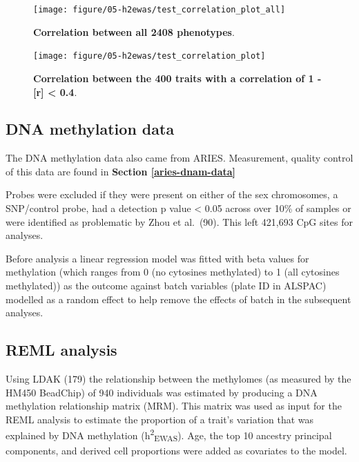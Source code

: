 \documentclass[11pt,oneside]{bristolthesis}
\begin{document}
\begin{figure}

{\centering \texttt{[image: figure/05-h2ewas/test\_correlation\_plot\_all]} 

}

\caption[Correlation between all 2408 phenotypes]{\textbf{Correlation between all 2408 phenotypes}.}\label{fig:h2ewas-pheno-corr-all}
\end{figure}



\begin{figure}

{\centering \texttt{[image: figure/05-h2ewas/test\_correlation\_plot]} 

}

\caption[Correlation between the 400 traits with a correlation of 1 - {[}r{]} \textless{} 0.4]{\textbf{Correlation between the 400 traits with a correlation of 1 - {[}r{]} \textless{} 0.4}.}\label{fig:h2ewas-pheno-corr-subset}
\end{figure}
\hypertarget{dna-methylation-data-05}{%
\subsection{DNA methylation data}\label{dna-methylation-data-05}}

The DNA methylation data also came from ARIES. Measurement, quality control of this data are found in \textbf{Section \ref{aries-dnam-data}}

Probes were excluded if they were present on either of the sex chromosomes, a SNP/control probe, had a detection p value \textless{} 0.05 across over 10\% of samples or were identified as problematic by Zhou et al.~(90). This left 421,693 CpG sites for analyses.

Before analysis a linear regression model was fitted with beta values for methylation (which ranges from 0 (no cytosines methylated) to 1 (all cytosines methylated)) as the outcome against batch variables (plate ID in ALSPAC) modelled as a random effect to help remove the effects of batch in the subsequent analyses.

\hypertarget{reml-analysis}{%
\subsection{REML analysis}\label{reml-analysis}}

Using LDAK (179) the relationship between the methylomes (as measured by the HM450 BeadChip) of 940 individuals was estimated by producing a DNA methylation relationship matrix (MRM). This matrix was used as input for the REML analysis to estimate the proportion of a trait's variation that was explained by DNA methylation (h\textsuperscript{2}\textsubscript{EWAS}). Age, the top 10 ancestry principal components, and derived cell proportions were added as covariates to the model.
\end{document}
